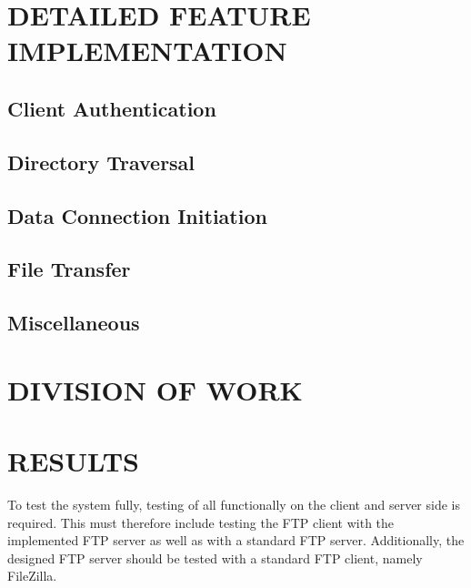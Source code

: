 \documentclass[10pt,twocolumn]{witseiepaper}
\begin{document}
\section{DETAILED FEATURE IMPLEMENTATION} %

\subsection{Client Authentication}

\subsection{Directory Traversal}

\subsection{Data Connection Initiation}

\subsection{File Transfer}

\subsection{Miscellaneous}




\section{DIVISION OF WORK}

\section{RESULTS}\label{results}

To test the system fully, testing of all functionally on the client and server side is required. This must therefore include testing the FTP client with the implemented FTP server as well as with a standard FTP server. Additionally, the designed FTP server should be tested with a standard FTP client, namely FileZilla.
\end{document}
